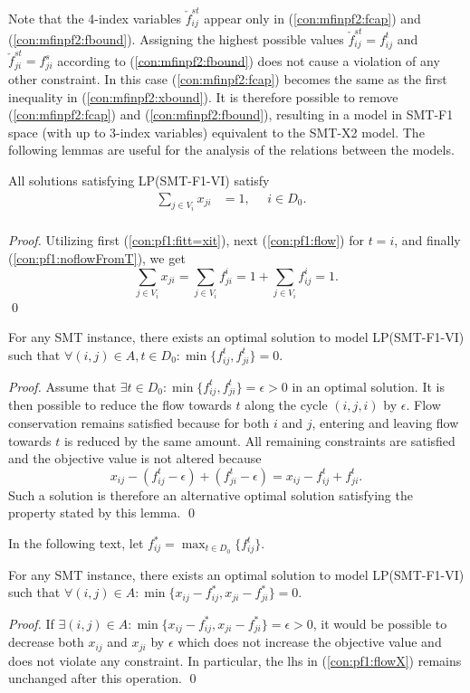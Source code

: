 Note that the 4-index variables $\check{f}^{st}_{ij}$ appear only in (\ref{con:mfinpf2:fcap}) and (\ref{con:mfinpf2:fbound}). Assigning the highest possible values $\check{f}^{st}_{ij}=f^{t}_{ij}$ and $\check{f}^{st}_{ji}=f^{s}_{ji}$ according to (\ref{con:mfinpf2:fbound}) does not cause a violation of any other constraint. In this case (\ref{con:mfinpf2:fcap}) becomes the same as the first inequality in (\ref{con:mfinpf2:xbound}). It is therefore possible to remove (\ref{con:mfinpf2:fcap}) and (\ref{con:mfinpf2:fbound}), resulting in a model in SMT-F1 space (with up to 3-index variables) equivalent to the SMT-X2 model. The following lemmas are useful for the analysis of the relations between the models. 
\begin{lemma}
All solutions satisfying LP(SMT-F1-VI) satisfy
\begin{align*}
\sum_{j\in V_i}x_{ji}&=1,~~~~~~ i\in D_0. & \label{eq:sumToD} \tag{A}\\
\end{align*}
\end{lemma}
\begin{proof}
 Utilizing first (\ref{con:pf1:fitt=xit}), next (\ref{con:pf1:flow}) for $t=i$, and finally (\ref{con:pf1:noflowFromT}), we get
$$\sum_{j\in V_i}x_{ji}=\sum_{j\in V_i}f_{ji}^i = 1+\sum_{j\in V_i}f_{ij}^i=1.$$\qed
\end{proof}
\begin{lemma}\label{lem:onedir} For any SMT instance, there exists an optimal solution to model LP(SMT-F1-VI) such that
$\forall (i,j)\in A, t\in D_0: \min\{f_{ij}^t,f_{ji}^t\} = 0.$
\end{lemma}
\begin{proof}
Assume that $\exists t\in D_0: \min\{f_{ij}^t,f_{ji}^t\} = \epsilon> 0$ in an optimal solution. It is then possible to reduce the flow towards $t$ along the cycle $(i,j,i)$ by $\epsilon$. Flow conservation remains satisfied because for both $i$ and $j$, entering and leaving flow towards $t$ is reduced by the same amount. All remaining constraints are satisfied and the objective value is not altered because 
$$
x_{ij}-(f_{ij}^t-\epsilon)+(f_{ji}^t-\epsilon) = x_{ij}-f_{ij}^t+f_{ji}^t.
$$
Such a solution is therefore an alternative optimal solution satisfying the property stated by this lemma.  \qed
\end{proof}
In the following text, let $f^*_{ij}=\max_{t\in D_0}\{f^t_{ij}\}$.
\begin{lemma}\label{lem:oneslack} For any SMT instance, there exists an optimal solution to model LP(SMT-F1-VI) such that 
$\forall (i,j)\in A: \min\{x_{ij} - f^*_{ij}, x_{ji}-f^*_{ji}\}=0$.
\end{lemma}
\begin{proof}
If $\exists (i,j)\in A: \min\{x_{ij} - f^*_{ij}, x_{ji}-f^*_{ji}\}=\epsilon>0$, it would be possible to decrease both $x_{ij}$ and $x_{ji}$ by $\epsilon$ which does not increase the objective value and does not violate any constraint. In particular, the lhs in (\ref{con:pf1:flowX}) remains unchanged after this operation.  \qed
\end{proof}

